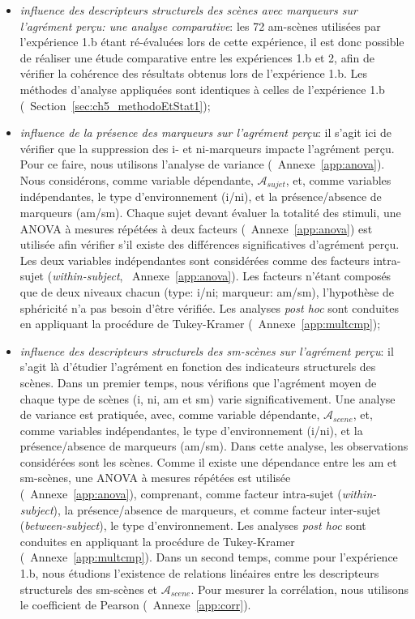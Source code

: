 \begin{itemize}
\item \emph{influence des descripteurs structurels des scènes avec marqueurs sur l'agrément perçu: une analyse comparative}: les 72 am-scènes utilisées par l'expérience 1.b étant ré-évaluées lors de cette expérience, il est donc possible de réaliser une étude comparative entre les expériences 1.b et 2, afin de vérifier la cohérence des résultats obtenus lors de l'expérience 1.b. Les méthodes d'analyse appliquées sont identiques à celles de l'expérience 1.b (\cf~Section~\ref{sec:ch5_methodoEtStat1});
\item \emph{influence de la présence des marqueurs sur l'agrément perçu}: il s'agit ici de vérifier que la suppression des i- et ni-marqueurs impacte l'agrément perçu. Pour ce faire, nous utilisons l'analyse de variance (\cf~Annexe~\ref{app:anova}). Nous considérons, comme variable dépendante,  $\mathcal{A}_{sujet}$, et, comme variables indépendantes, le type d'environnement (i/ni), et la présence/absence de marqueurs (am/sm). Chaque sujet devant évaluer la totalité des stimuli, une ANOVA à mesures répétées à deux facteurs (\cf~Annexe~\ref{app:anova}) est utilisée afin vérifier s'il existe des différences significatives d'agrément perçu. Les deux variables indépendantes sont considérées comme des facteurs intra-sujet (\emph{within-subject}, \cf~Annexe~\ref{app:anova}). Les facteurs n'étant composés que de deux niveaux chacun (type: i/ni; marqueur: am/sm), l'hypothèse de sphéricité n'a pas besoin d'être vérifiée. Les analyses \emph{post hoc} sont conduites en appliquant la procédure de Tukey-Kramer (\cf~Annexe~\ref{app:multcmp});
\item \emph{influence des descripteurs structurels des sm-scènes sur l'agrément perçu}: il s'agit là d'étudier l'agrément en fonction des indicateurs structurels des scènes. Dans un premier temps, nous vérifions que l'agrément moyen de chaque type de scènes (i, ni, am et sm) varie significativement. Une analyse de variance est pratiquée, avec, comme variable dépendante, $\mathcal{A}_{scene}$, et, comme variables indépendantes, le type d'environnement (i/ni), et la présence/absence de marqueurs (am/sm). Dans cette analyse, les observations considérées sont les scènes. Comme il existe une dépendance entre les am et sm-scènes, une ANOVA à mesures répétées est utilisée (\cf~Annexe~\ref{app:anova}), comprenant, comme facteur intra-sujet (\emph{within-subject}), la présence/absence de marqueurs, et comme facteur inter-sujet (\emph{between-subject}), le type d'environnement. Les analyses \emph{post hoc} sont conduites en appliquant la procédure de Tukey-Kramer (\cf~Annexe~\ref{app:multcmp}). Dans un second temps, comme pour l'expérience 1.b, nous étudions l'existence de relations linéaires entre les descripteurs structurels des sm-scènes et $\mathcal{A}_{scene}$. Pour mesurer la corrélation, nous utilisons le coefficient de Pearson (\cf~Annexe~\ref{app:corr}).
\end{itemize}

